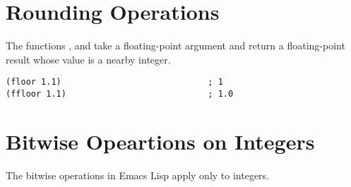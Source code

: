 \section{Rounding Operations}
\label{sec:rounding-operations}

The functions , and  take a floating-point argument and return a floating-point result whose value is a nearby integer.

\begin{lstlisting}
(floor 1.1)                             ; 1
(ffloor 1.1)                            ; 1.0
\end{lstlisting}

\section{Bitwise Opeartions on Integers}
\label{sec:bitw-opeart-iteg}

The bitwise operations in Emacs Lisp apply only to integers.

